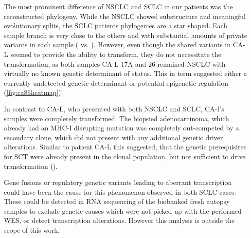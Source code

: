 The most prominent difference of NSCLC and SCLC in our patients was the reconstructed phylogeny. While the NSCLC showed substructure and meaningful evolutionary splits, the SCLC patients phylogenies are a star shaped. Each sample branch is very close to the others and with substantial amounts of private variants in each sample ( vs. ). However, even though the shared variants in CA-L seemed to provide the ability to transform, they do not necessitate the transformation, as both samples CA-L 17A and 26 remained NSCLC with virtually no known genetic determinant of status. This in term suggested either a currently undetected genetic determinant or potential epigenetic regulation (\autoref{fig:ca86heatmap}).

In contrast to CA-L, who presented with both NSCLC and SCLC, CA-I's samples were completely transformed. The biopsied adenocarcinoma, which already had an MHC-I disrupting mutation was completely out-competed by a secondary clone, which did not present with any additional genetic driver alterations. Similar to patient CA-L this suggested, that the genetic prerequisites for SCT were already present in the clonal population, but not sufficient to drive transformation (). 

Gene fusions or regulatory genetic variants leading to aberrant transcription could have been the cause for this phenomenon observed in both SCLC cases. These could be detected in RNA sequencing of the biobanked fresh autopsy samples to exclude genetic causes which were not picked up with the performed WES, or detect transcription alterations. However this analysis is outside the scope of this work.

